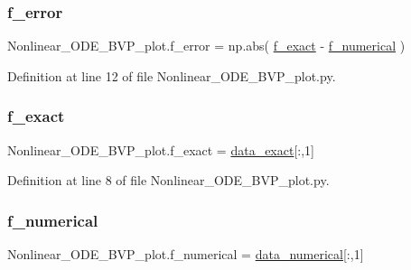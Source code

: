 \subsubsection{\texorpdfstring{f\+\_\+error}{f\_error}}
{\footnotesize\ttfamily Nonlinear\+\_\+\+O\+D\+E\+\_\+\+B\+V\+P\+\_\+plot.\+f\+\_\+error = np.\+abs( \hyperlink{namespaceNonlinear__ODE__BVP__plot_a846fb76e3260067ca8a8d9d79211e6fd}{f\+\_\+exact} -\/ \hyperlink{namespaceNonlinear__ODE__BVP__plot_ab81728aecabb942c491c297826ebf71e}{f\+\_\+numerical} )}



Definition at line 12 of file Nonlinear\+\_\+\+O\+D\+E\+\_\+\+B\+V\+P\+\_\+plot.\+py.

\mbox{\label{namespaceNonlinear__ODE__BVP__plot_a846fb76e3260067ca8a8d9d79211e6fd}} 
\subsubsection{\texorpdfstring{f\+\_\+exact}{f\_exact}}
{\footnotesize\ttfamily Nonlinear\+\_\+\+O\+D\+E\+\_\+\+B\+V\+P\+\_\+plot.\+f\+\_\+exact = \hyperlink{namespaceNonlinear__ODE__BVP__plot_a8a4b03bd9076bc386fff3acd096abbf7}{data\+\_\+exact}\mbox{[}\+:,1\mbox{]}}



Definition at line 8 of file Nonlinear\+\_\+\+O\+D\+E\+\_\+\+B\+V\+P\+\_\+plot.\+py.

\mbox{\label{namespaceNonlinear__ODE__BVP__plot_ab81728aecabb942c491c297826ebf71e}} 
\subsubsection{\texorpdfstring{f\+\_\+numerical}{f\_numerical}}
{\footnotesize\ttfamily Nonlinear\+\_\+\+O\+D\+E\+\_\+\+B\+V\+P\+\_\+plot.\+f\+\_\+numerical = \hyperlink{namespaceNonlinear__ODE__BVP__plot_ab0290e43d5713cc17b0d8faed42e013f}{data\+\_\+numerical}\mbox{[}\+:,1\mbox{]}}



